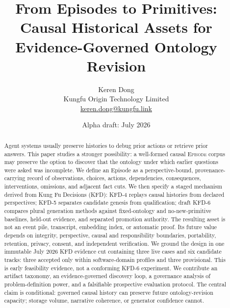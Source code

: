 \documentclass[11pt]{article}
\title{From Episodes to Primitives:\\
Causal Historical Assets for Evidence-Governed Ontology Revision}
\author{Keren Dong\\Kungfu Origin Technology Limited\\\href{mailto:keren.dong@kungfu.link}{keren.dong@kungfu.link}}
\date{Alpha draft: July 2026}
\newcommand{\episode}{\textsc{Episode}}
\begin{document}
\maketitle

\begin{abstract}
Agent systems usually preserve histories to debug prior actions or retrieve
prior answers. This paper studies a stronger possibility: a well-formed causal
\episode{} corpus may preserve the option to discover that the ontology under
which earlier questions were asked was incomplete. We define an Episode as a
perspective-bound, provenance-carrying record of observations, choices,
actions, dependencies, consequences, interventions, omissions, and adjacent
fact cuts. We then specify a staged mechanism derived from Kung Fu Decisions
(KFD): KFD-4 replays causal histories from declared perspectives; KFD-5
separates candidate genesis from qualification; draft KFD-6 compares plural
generation methods against fixed-ontology and no-new-primitive baselines,
held-out evidence, and separated promotion authority. The resulting asset is
not an event pile, transcript, embedding index, or automatic proof. Its future
value depends on integrity, perspective, causal and responsibility boundaries,
portability, retention, privacy, consent, and independent verification. We
ground the design in one immutable July 2026 KFD evidence cut containing three
live cases and six candidate tracks: three accepted only within software-domain
profiles and three provisional. This is early feasibility evidence, not a
conforming KFD-6 experiment. We contribute an artifact taxonomy, an
evidence-governed discovery loop, a governance analysis of problem-definition
power, and a falsifiable prospective evaluation protocol. The central claim is
conditional: governed causal history can preserve future ontology-revision
capacity; storage volume, narrative coherence, or generator confidence cannot.
\end{abstract}











\begingroup
\raggedright


\endgroup
\end{document}
